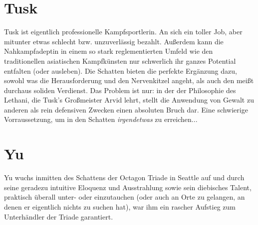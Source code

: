 \section{Tusk}
Tusk ist eigentlich professionelle Kampfsportlerin. An sich ein toller Job, aber mitunter etwas schlecht bzw. unzuverlässig bezahlt. Außerdem kann die Nahkampfadeptin in einem so stark reglementierten Umfeld wie den traditionellen asiatischen Kampfkünsten nur schwerlich ihr ganzes Potential entfalten (oder ausleben). Die Schatten bieten die perfekte Ergänzung dazu, sowohl was die Herausforderung und den Nervenkitzel angeht, als auch den meißt durchaus soliden Verdienst. Das Problem ist nur: in der der Philosophie des Lethani, die Tusk's Großmeister Arvid lehrt, stellt die Anwendung von Gewalt zu anderen als rein defensiven Zwecken einen absoluten Bruch dar. Eine schwierige Vorraussetzung, um in den Schatten \textit{irgendetwas} zu erreichen...



\section{Yu}

Yu wuchs inmitten des Schattens der Octagon Triade in Seattle auf und durch seine geradezu intuitive Eloquenz und Ausstrahlung sowie sein diebisches Talent, praktisch überall unter- oder einzutauchen (oder auch an Orte zu gelangen, an denen er eigentlich nichts zu suchen hat), war ihm ein rascher Aufstieg zum Unterhändler der Triade garantiert.

